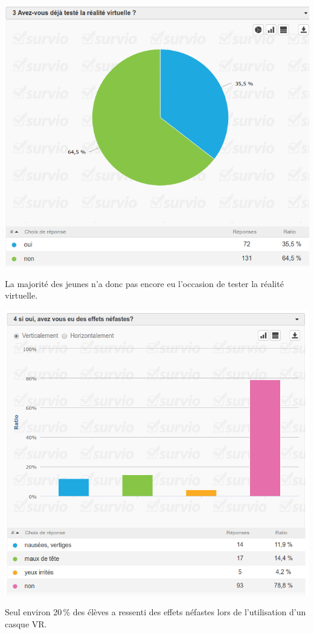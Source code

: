 \documentclass[12pt, a4paper]{report}
\begin{document}
\begin{center}
\includegraphics[scale=0.5]{3.png}

La majorité des jeunes n'a donc pas encore eu l'occasion de tester la réalité virtuelle.
\end{center}

\begin{center}
\includegraphics[scale=0.5]{4.png}

Seul environ 20\,\% des élèves a ressenti des effets néfastes lors de l'utilisation d'un casque VR.
\end{center}
\end{document}

